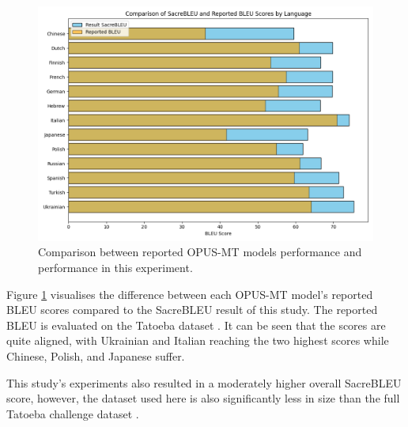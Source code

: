 \documentclass[a4paper, 11pt]{article}
\begin{document}
\begin{figure}[htbp]
    \centering
    \includegraphics[width=0.8\linewidth]{figures/opus_bleu_comparison.png}
    \caption{Comparison between reported OPUS-MT models performance and performance in this experiment.}
    \label{fig:opus_comparison}
\end{figure}

Figure \ref{fig:opus_comparison} visualises the difference between each OPUS-MT model's reported BLEU scores compared to the SacreBLEU result of this study. The reported BLEU is evaluated on the Tatoeba dataset \cite{tiedemann-2020-opus-mt}. It can be seen that the scores are quite aligned, with Ukrainian and Italian reaching the two highest scores while Chinese, Polish, and Japanese suffer.

This study's experiments also resulted in a moderately higher overall SacreBLEU score, however, the dataset used here is also significantly less in size than the full Tatoeba challenge dataset \cite{tiedemann-2020-tatoeba-challenge}.
\end{document}
